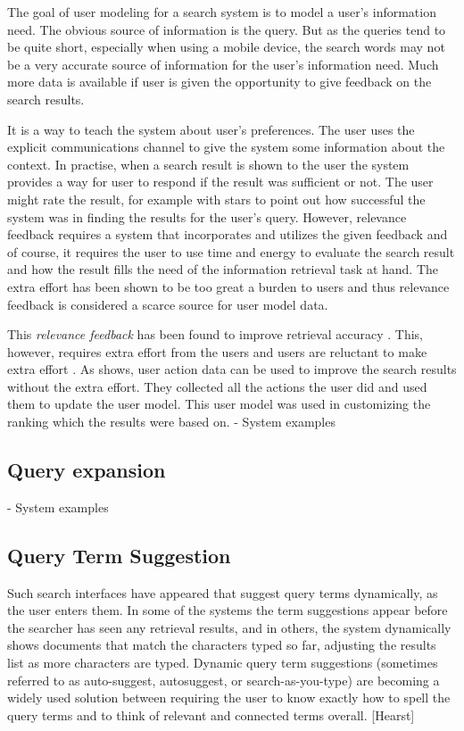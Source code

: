 \documentclass{sigchi}
\begin{document}
The goal of user modeling for a search system is to model a user's information need. The obvious source of information is the query. But as the queries tend to be quite short, especially when using a mobile device, the search words may not be a very accurate source of information for the user's information need. Much more data is available if user is given the opportunity to give feedback on the search results. 

It is a way to teach the system about user’s preferences. The user uses the explicit communications channel to give the system some information about the context. In practise, when a search result is shown to the user the system provides a way for user to respond if the result was sufficient or not. The user might rate the result, for example with stars to point out how successful the system was in finding the results for the user’s query. However, relevance feedback requires a system that incorporates and utilizes the given feedback and of course, it requires the user to use time and energy to evaluate the search result and how the result fills the need of the information retrieval task at hand. The extra effort has been shown to be too great a burden to users and thus relevance feedback is considered a scarce source for user model data.

This \emph{relevance feedback} has been found to improve retrieval accuracy \cite{salton90}. This, however, requires extra effort from the users and users are reluctant to make extra effort \cite{kelly03}. As \cite{shen05} shows, user action data can be used to improve the search results without the extra effort. They collected all the actions the user did and used them to update the user model. This user model was used in customizing the ranking which the results were based on.
- System examples
\subsection{Query expansion}
- System examples

\subsection{Query Term Suggestion}

Such search interfaces have appeared that suggest query terms dynamically, as the user enters them. In some of the systems the term suggestions appear before the searcher has seen any retrieval results, and in others, the system dynamically shows documents that match the characters typed so far, adjusting the results list as more characters are typed. Dynamic query term suggestions (sometimes referred to as auto-suggest, autosuggest, or search-as-you-type) are becoming a widely used solution between requiring the user to know exactly how to spell the query terms and to think of relevant and connected terms overall. [Hearst]
\end{document}
